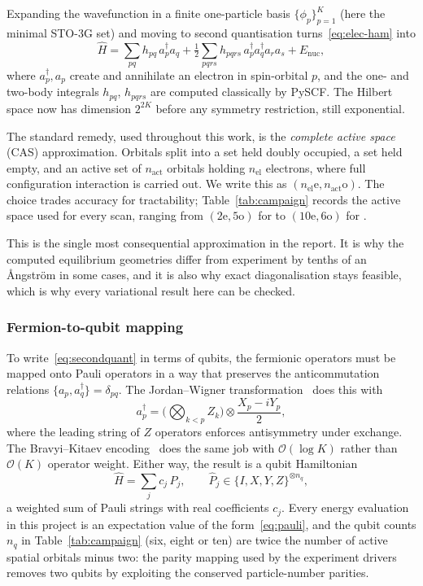 \documentclass[sigconf,screen,nonacm]{acmart}
\begin{document}
Expanding the wavefunction in a finite one-particle basis
$\{\phi_p\}_{p=1}^{K}$ (here the minimal STO-3G set) and moving to second
quantisation turns~\eqref{eq:elec-ham} into
\begin{equation}
\hat{H} = \sum_{pq} h_{pq}\, a_p^\dagger a_q
        + \tfrac{1}{2}\sum_{pqrs} h_{pqrs}\, a_p^\dagger a_q^\dagger a_r a_s
        + E_{\text{nuc}},
\label{eq:secondquant}
\end{equation}
where $a_p^\dagger,a_p$ create and annihilate an electron in spin-orbital
$p$, and the one- and two-body integrals $h_{pq}$, $h_{pqrs}$ are computed
classically by PySCF. The Hilbert space now has dimension $2^{2K}$ before any
symmetry restriction, still exponential.

The standard remedy, used throughout this work, is the \emph{complete active
space} (CAS) approximation. Orbitals split into a set held doubly occupied, a
set held empty, and an active set of $n_{\text{act}}$ orbitals holding
$n_{\text{el}}$ electrons, where full configuration interaction is carried
out. We write this as $(n_{\text{el}}\text{e}, n_{\text{act}}\text{o})$. The
choice trades accuracy for tractability; Table~\ref{tab:campaign} records the
active space used for every scan, ranging from $(2\text{e},5\text{o})$ for
 to $(10\text{e},6\text{o})$ for .

This is the single most consequential approximation in the report. It is why
the computed equilibrium geometries differ from experiment by tenths of an
\AA ngstr\"om in some cases, and it is also why exact diagonalisation stays
feasible, which is why every variational result here can be checked.

\subsubsection{Fermion-to-qubit mapping}

To write~\eqref{eq:secondquant} in terms of qubits, the fermionic operators
must be mapped onto Pauli operators in a way that preserves the
anticommutation relations $\{a_p, a_q^\dagger\} = \delta_{pq}$. The
Jordan--Wigner transformation~\cite{jordanwigner} does this with
\begin{equation}
a_p^\dagger = \Big(\bigotimes_{k<p} Z_k\Big)\otimes \frac{X_p - iY_p}{2},
\end{equation}
where the leading string of $Z$ operators enforces antisymmetry under
exchange. The Bravyi--Kitaev encoding~\cite{bravyikitaev} does the same job
with $\mathcal{O}(\log K)$ rather than $\mathcal{O}(K)$ operator weight.
Either way, the result is a qubit Hamiltonian
\begin{equation}
\hat{H} = \sum_{j} c_j\, \hat{P}_j,
\qquad
\hat{P}_j \in \{I,X,Y,Z\}^{\otimes n_q},
\label{eq:pauli}
\end{equation}
a weighted sum of Pauli strings with real coefficients $c_j$. Every energy
evaluation in this project is an expectation value of the
form~\eqref{eq:pauli}, and the qubit counts $n_q$ in Table~\ref{tab:campaign}
(six, eight or ten) are twice the number of active spatial orbitals minus
two: the parity mapping used by the experiment drivers removes two qubits by
exploiting the conserved particle-number parities.
\end{document}
